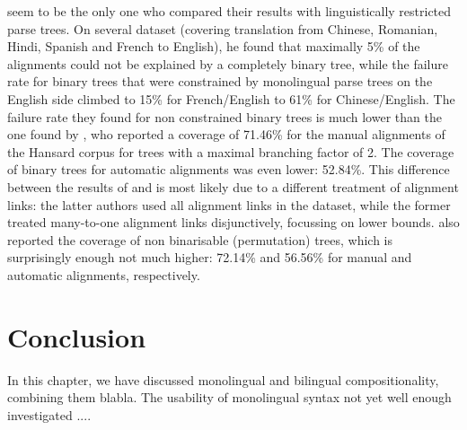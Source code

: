 \documentclass{report}
\theoremstyle{break}
\begin{document}
\cite{wellington2006empirical} seem to be the only one who compared their results with linguistically restricted parse trees. On several dataset (covering translation from Chinese, Romanian, Hindi, Spanish and French to English), he found that maximally 5\% of the alignments could not be explained by a completely binary tree, while the failure rate for binary trees that were constrained by monolingual parse trees on the English side climbed to 15\% for French/English to 61\% for Chinese/English. The failure rate they found for non constrained binary trees is much lower than the one found by \cite{simaan2013hats}, who reported a coverage of 71.46\% for the manual alignments of the Hansard corpus for trees with a maximal branching factor of 2. The coverage of binary trees for automatic alignments was even lower: 52.84\%. This difference between the results of \cite{wellington2006empirical} and \cite{simaan2013hats} is most likely due to a different treatment of alignment links: the latter authors used all alignment links in the dataset, while the former treated many-to-one alignment links disjunctively, focussing on lower bounds. \cite{simaan2013hats} also reported the coverage of non binarisable (permutation) trees, which is surprisingly enough not much higher: 72.14\% and 56.56\% for manual and automatic alignments, respectively.

\section{Conclusion}

In this chapter, we have discussed monolingual and bilingual compositionality, combining them blabla. The usability of monolingual syntax not yet well enough investigated .... 


\end{document}
